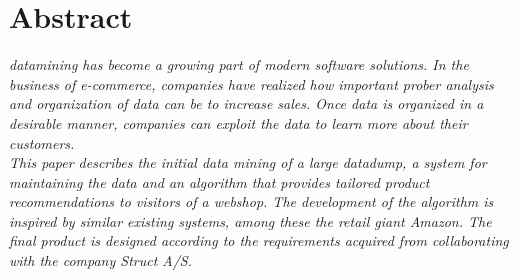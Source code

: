 \chapter{Abstract}
\textit{\gls{datamining} has become a growing part of modern software solutions. In the business of e-commerce, companies have realized how important prober analysis and organization of data can be to increase sales. Once data is organized in a desirable manner, companies can exploit the data to learn more about their customers.\\
This paper describes the initial data mining of a large datadump, a system for maintaining the data and an algorithm that provides tailored product recommendations to visitors of a webshop.
The development of the algorithm is inspired by similar existing systems, among these the retail giant Amazon. The final product is designed according to the requirements acquired from collaborating with the company Struct A/S.}
